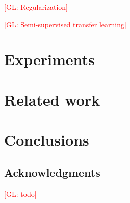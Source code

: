\documentclass{article}
\newcommand{\glnote}[1]{\textcolor{red}{[GL: #1]}}
\begin{document}
\glnote{Regularization}

\glnote{Semi-supervised transfer learning}

\section{Experiments}


\section{Related work}


\section{Conclusions}


\subsection*{Acknowledgments}

\glnote{todo}



\end{document}
